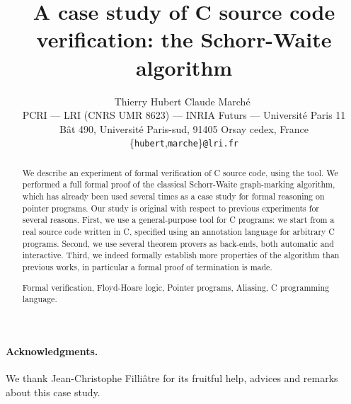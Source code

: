 \documentclass[pagenumbers]{ieee}
\begin{document}
\sloppy

\title{A case study of C source code verification: the Schorr-Waite algorithm}
\author{~\hfill Thierry Hubert \hfill\hfill Claude March\'e \hfill~\\
PCRI --- LRI (CNRS UMR 8623) --- INRIA Futurs ---
  Universit\'e Paris 11 \\
B\^at 490, Universit\'e Paris-sud, 91405 Orsay cedex, France \\
\{\texttt{hubert},\texttt{marche}\}\texttt{@lri.fr} 
}
\maketitle

\begin{abstract}
  We describe an experiment of formal verification of C source code,
  using the \caduceus{} tool. We performed a full formal proof of the
  classical Schorr-Waite graph-marking algorithm, which has already
  been used several times as a case study for formal reasoning on
  pointer programs. Our study is original with respect to previous
  experiments for several reasons. First, we use a general-purpose
  tool for C programs: we start from a real source code written in
  C, specified using an annotation language for arbitrary C programs.
  Second, we use several theorem provers as back-ends, both automatic
  and interactive.  Third, we indeed formally establish more
  properties of the algorithm than previous works, in particular a
  formal proof of termination is made.

   Formal verification, Floyd-Hoare logic,
  Pointer programs, Aliasing, C programming language.
\end{abstract}








\bigskip
\paragraph{Acknowledgments.} 
We thank Jean-Christophe Filli\^atre for its fruitful help, advices and
remarks about this case study.



\end{document}
